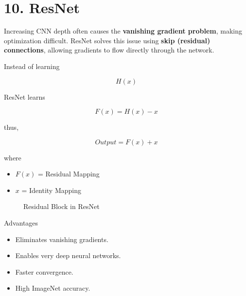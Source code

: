 \documentclass[11pt]{article}
\begin{document}
\section*{10. ResNet}

Increasing CNN depth often causes the \textbf{vanishing gradient problem},
making optimization difficult. ResNet solves this issue using
\textbf{skip (residual) connections}, allowing gradients to flow directly
through the network.

Instead of learning

\[
H(x)
\]

ResNet learns

\[
F(x)=H(x)-x
\]

thus,

\[
Output = F(x)+x
\]

where

\begin{itemize}
\item $F(x)$ = Residual Mapping
\item $x$ = Identity Mapping
\end{itemize}

\begin{figure}[H]
\centering


\caption{Residual Block in ResNet}
\end{figure}

Advantages

\begin{itemize}
\item Eliminates vanishing gradients.
\item Enables very deep neural networks.
\item Faster convergence.
\item High ImageNet accuracy.
\end{itemize}
\end{document}

